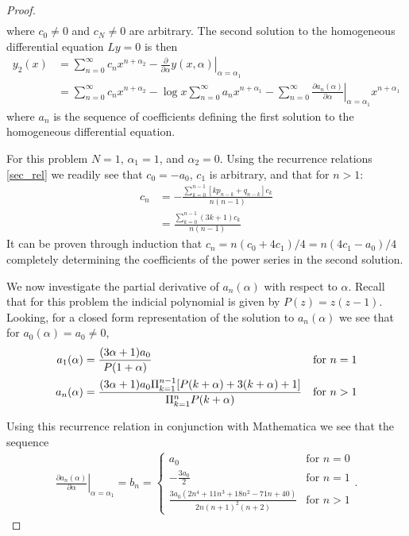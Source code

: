 \documentclass[12pt]{article}
\theoremstyle{definition}
\begin{document}
\begin{proof}
\begin{align}
  \end{align}
  where $c_0 \neq 0$ and $c_N\neq 0$ are arbitrary. The second solution to the homogeneous differential equation  $Ly=0$ is then
  \begin{align*}
    y_2(x) &= \sum_{n=0}^\infty c_n x^{n+\alpha_2} - \left.\frac{\partial}{\partial\alpha}y(x,\alpha)\right|_{\alpha=\alpha_1} \\
    &= \sum_{n=0}^\infty c_n x^{n+\alpha_2} - \log x\sum_{n=0}^{\infty}a_n x^{n+\alpha_1} - \sum_{n=0}^\infty\left.\frac{\partial a_n(\alpha)}{\partial \alpha}\right|_{\alpha=\alpha_1} x^{n+\alpha_1}
  \end{align*}
  where $a_n$ is the sequence of coefficients defining the first solution to the homogeneous differential equation.

  For this problem $N=1$, $\alpha_1 = 1$, and $\alpha_2 = 0$. Using the recurrence relations \eqref{sec_rel} we readily see that
  $c_0 = -a_0$, $c_1$ is arbitrary, and that for $n>1$:
  \begin{align*}
    c_n &= -\frac{\sum_{k=0}^{n-1}[kp_{n-k}+q_{n-k}]c_k}{n(n-1)}\\
    &= \frac{\sum_{k=0}^{n-1}(3k+1)c_k}{n(n-1)}
  \end{align*}
  It can be proven through induction that $c_n = n(c_0 + 4c_1)/4 = n(4c_1 - a_0)/4$ completely determining the coefficients of the power series in the second solution.

  We now investigate the partial derivative of $a_n(\alpha)$ with respect to $\alpha$.
  Recall that for this problem the indicial polynomial is given by $P(z) = z(z-1)$.
  Looking, for a closed form representation of the solution to $a_n(\alpha)$ we see that for $a_0(\alpha) = a_0 \neq 0$,
  \begin{align*}
    a_1(\alpha) &= \frac{(3\alpha + 1)a_0}{P(1+\alpha)} &\text{for $n = 1$} \\
    a_n(\alpha) &= \frac{(3\alpha + 1)a_0 \Pi_{k=1}^{n-1} [P(k+\alpha) + 3(k + \alpha) + 1]}{\Pi_{k=1}^n P(k+\alpha)} & \text{for $ n > 1$}
  \end{align*}

  Using this recurrence relation in conjunction with Mathematica we see that the sequence
  \begin{align*}
    \left.\frac{\partial a_n(\alpha)}{\partial \alpha}\right|_{\alpha=\alpha_1} = b_n =
    \begin{cases}
      a_0 &\text{for $n=0$} \\
      -\frac{3a_0}{2} &\text{for $n=1$} \\
      \frac{3a_0(2n^4 +11n^3+18n^2-71n+40)}{2n(n+1)^2(n+2)} &\text{for $n>1$}
    \end{cases}.
  \end{align*}


\end{proof}
\end{document}
